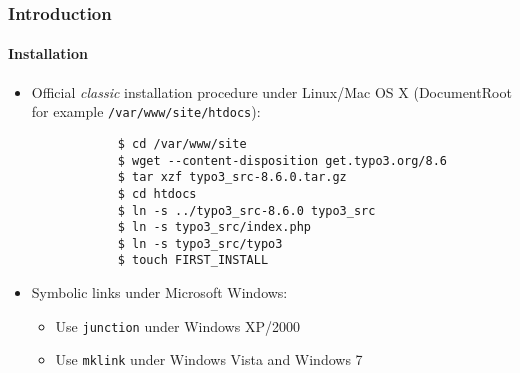 \begin{frame}[fragile]
	\frametitle{Introduction}
	\framesubtitle{Installation}

	\begin{itemize}
		\item Official \textit{classic} installation procedure under Linux/Mac OS X\newline
			(DocumentRoot for example \texttt{/var/www/site/htdocs}):
		\begin{lstlisting}
			$ cd /var/www/site
			$ wget --content-disposition get.typo3.org/8.6
			$ tar xzf typo3_src-8.6.0.tar.gz
			$ cd htdocs
			$ ln -s ../typo3_src-8.6.0 typo3_src
			$ ln -s typo3_src/index.php
			$ ln -s typo3_src/typo3
			$ touch FIRST_INSTALL
		\end{lstlisting}

		\item Symbolic links under Microsoft Windows:

			\begin{itemize}
				\item Use \texttt{junction} under Windows XP/2000
				\item Use \texttt{mklink} under Windows Vista and Windows 7
			\end{itemize}

	\end{itemize}
\end{frame}


